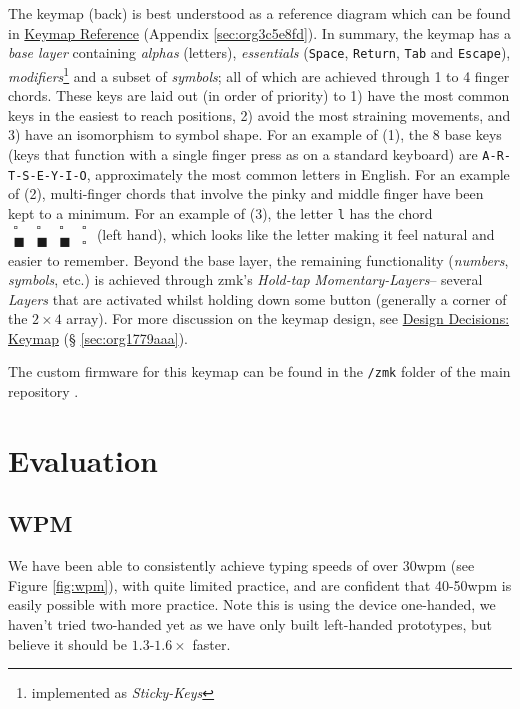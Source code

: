 \documentclass[logo,bsc,singlespacing,parskip]{infthesis}
\begin{document}
The keymap (back) is best understood as a reference diagram which can be found in
\hyperref[sec:org3c5e8fd]{Keymap Reference} (Appendix \ref{sec:org3c5e8fd}).
In summary, the keymap has a \emph{base layer} containing \emph{alphas} (letters), \emph{essentials} (\texttt{Space}, \texttt{Return}, \texttt{Tab} and \texttt{Escape}), \emph{modifiers}\footnote{implemented as \emph{Sticky-Keys}} and a subset of \emph{symbols}; all of which are achieved through 1 to 4 finger chords.
These keys are laid out (in order of priority) to 1) have the most common keys in the easiest to reach positions, 2) avoid the most straining movements, and 3) have an isomorphism to symbol shape.
For an example of (1), the 8 base keys (keys that function with a single finger press as on a standard keyboard) are  \texttt{A-R-T-S-E-Y-I-O}, approximately the most common letters in English.
For an example of (2), multi-finger chords that involve the pinky and middle finger have been kept to a minimum.
For an example of (3), the letter \texttt{l} has the chord \(\begin{matrix} \square & \square  & \square  & \square \\ \blacksquare &  \blacksquare & \blacksquare & \square \end{matrix}\) (left hand), which looks like the letter making it feel natural and easier to remember.
Beyond the base layer, the remaining functionality (\emph{numbers}, \emph{symbols}, etc.) is achieved through zmk's \autocite{ZMKFirmware}  \emph{Hold-tap} \emph{Momentary-Layers}-- several \emph{Layers} that are activated whilst holding down some button (generally a corner of the \(2\times4\) array).
For more discussion on the keymap design, see \hyperref[sec:org1779aaa]{Design Decisions: Keymap} (§ \ref{sec:org1779aaa}).

The custom firmware for this keymap can be found in the \texttt{/zmk} folder of the main repository \autocite{sharpNazzacodeHCIDMy}.
\section{Evaluation}
\label{sec:org31fbe82}
\subsection{WPM}
\label{sec:org1af1a3e}
We have been able to consistently achieve typing speeds of over 30wpm (see Figure \ref{fig:wpm}), with quite limited practice, and are confident that 40-50wpm is easily possible with more practice.
Note this is using the device one-handed, we haven't tried two-handed yet as we have only built left-handed prototypes, but believe it should be \(1.3\)-\(1.6\times\) faster.
\end{document}
